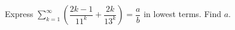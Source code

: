 Express $\sum_{k=1}^\infty\left(\dfrac{2k-1}{11^k}+\dfrac{2k}{13^k}\right)=\dfrac{a}{b}$ in lowest terms. Find $a$.
